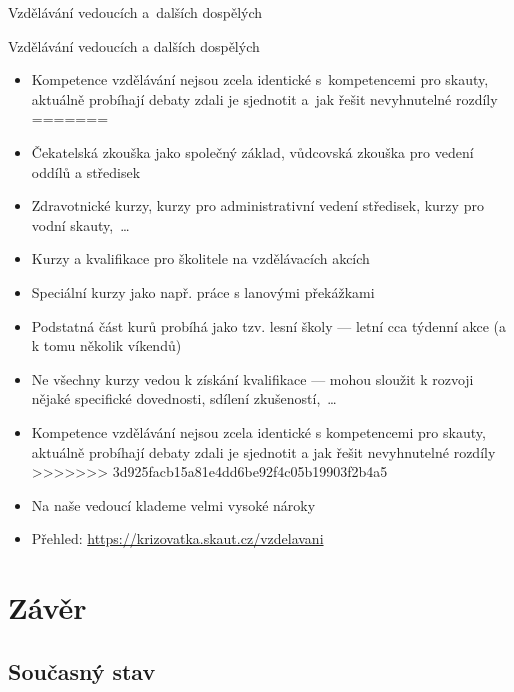 \documentclass[compress, xelatex, 11pt, xcolor=dvipsnames, aspectratio=169, url={hyphens, lowtilde}]{beamer}
\begin{document}
\begin{frame}[allowframebreaks]{Vzdělávání vedoucích a~dalších dospělých}
\begin{itemize}
\begin{frame}[allowframebreaks]{Vzdělávání vedoucích a dalších dospělých}
\begin{itemize}
		\item Kompetence vzdělávání nejsou zcela identické s~kompetencemi pro skauty, aktuálně probíhají debaty zdali je sjednotit a~jak řešit nevyhnutelné rozdíly
=======
		\item Čekatelská zkouška jako společný základ, vůdcovská zkouška pro vedení oddílů a středisek
		\item Zdravotnické kurzy, kurzy pro administrativní vedení středisek, kurzy pro vodní skauty,~\ldots
		\item Kurzy a kvalifikace pro školitele na vzdělávacích akcích
		\item Speciální kurzy jako např. práce s lanovými překážkami
		\item Podstatná část kurů probíhá jako tzv. lesní školy --- letní cca týdenní akce (a k tomu několik víkendů)
		\item Ne všechny kurzy vedou k získání kvalifikace --- mohou sloužit k rozvoji nějaké specifické dovednosti, sdílení zkušeností,~\ldots
		\item Kompetence vzdělávání nejsou zcela identické s kompetencemi pro skauty, aktuálně probíhají debaty zdali je sjednotit a jak řešit nevyhnutelné rozdíly
>>>>>>> 3d925facb15a81e4dd6be92f4c05b19903f2b4a5
		\item Na naše vedoucí klademe velmi vysoké nároky
		\item Přehled: \url{https://krizovatka.skaut.cz/vzdelavani}
	\end{itemize}
\end{frame}

\section{Závěr}

\subsection{Současný stav}


\end{itemize}
\end{frame}
\end{document}
